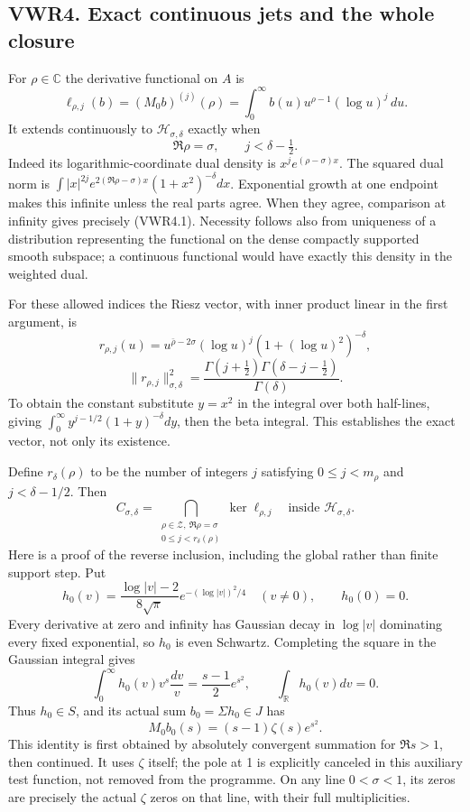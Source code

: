 \subsection{VWR4. Exact continuous jets and the whole
closure}\label{vwr4.-exact-continuous-jets-and-the-whole-closure}

For \(\rho\in\mathbb C\) the derivative functional on \(A\) is \[
\ell_{\rho,j}(b)=(M_0b)^{(j)}(\rho)
=\int_0^\infty b(u)u^{\rho-1}(\log u)^j\,du.
\] It extends continuously to \(\mathcal H_{\sigma,\delta}\) exactly
when \[
\Re\rho=\sigma,\qquad j<\delta-\tfrac12.
\tag{VWR4.1}
\] Indeed its logarithmic-coordinate dual density is
\(x^je^{(\rho-\sigma)x}\). The squared dual norm is
\(\int |x|^{2j}e^{2(\Re\rho-\sigma)x}(1+x^2)^{-\delta}dx\). Exponential
growth at one endpoint makes this infinite unless the real parts agree.
When they agree, comparison at infinity gives precisely (VWR4.1).
Necessity follows also from uniqueness of a distribution representing
the functional on the dense compactly supported smooth subspace; a
continuous functional would have exactly this density in the weighted
dual.

For these allowed indices the Riesz vector, with inner product linear in
the first argument, is \[
r_{\rho,j}(u)=u^{\bar\rho-2\sigma}(\log u)^j(1+(\log u)^2)^{-\delta},
\] \[
\|r_{\rho,j}\|_{\sigma,\delta}^2
=\frac{\Gamma(j+\tfrac12)\Gamma(\delta-j-\tfrac12)}{\Gamma(\delta)}.
\tag{VWR4.2}
\] To obtain the constant substitute \(y=x^2\) in the integral over both
half-lines, giving \(\int_0^\infty y^{j-1/2}(1+y)^{-\delta}dy\), then
the beta integral. This establishes the exact vector, not only its
existence.

Define \(r_\delta(\rho)\) to be the number of integers \(j\) satisfying
\(0\le j<m_\rho\) and \(j<\delta-1/2\). Then \[
C_{\sigma,\delta}
=\bigcap_{\substack{\rho\in\mathscr Z,\ \Re\rho=\sigma\\0\le j<r_\delta(\rho)}}\ker\ell_{\rho,j}
\quad\text{inside }\mathcal H_{\sigma,\delta}.
\tag{VWR4.3}
\] Here is a proof of the reverse inclusion, including the global rather
than finite support step. Put \[
h_0(v)=\frac{\log|v|-2}{8\sqrt\pi}e^{-(\log|v|)^2/4}\quad(v\ne0),\qquad h_0(0)=0.
\] Every derivative at zero and infinity has Gaussian decay in
\(\log|v|\) dominating every fixed exponential, so \(h_0\) is even
Schwartz. Completing the square in the Gaussian integral gives \[
\int_0^\infty h_0(v)v^s\frac{dv}{v}=\frac{s-1}{2}e^{s^2},\qquad
\int_{\mathbb R}h_0(v)dv=0.
\] Thus \(h_0\in S\), and its actual sum \(b_0=\Sigma h_0\in J\) has \[
M_0b_0(s)=(s-1)\zeta(s)e^{s^2}.
\tag{VWR4.4}
\] This identity is first obtained by absolutely convergent summation
for \(\Re s>1\), then continued. It uses \(\zeta\) itself; the pole at 1
is explicitly canceled in this auxiliary test function, not removed from
the programme. On any line \(0<\sigma<1\), its zeros are precisely the
actual \(\zeta\) zeros on that line, with their full multiplicities.

